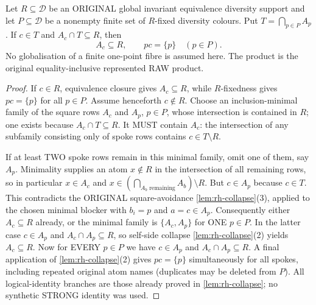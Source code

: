 \begin{lemma}
\label{lem:rh-spoke-square-localisation}
Let $R\subseteq\mathcal D$ be an ORIGINAL global
invariant equivalence diversity support and
let $P\subseteq\mathcal D$ be a nonempty
finite set of $R$-fixed diversity colours.
Put $T=\bigcap_{p\in P}A_p$.
If $c\in T$ and $A_c\cap T\subseteq R$, then
\[
              A_c\subseteq R,
              \qquad pc=\{p\}\quad(p\in P).
\]
No globalisation of a finite one-point fibre is
assumed here. The product is the original
equality-inclusive represented RAW product.
\end{lemma}
\begin{proof}
If $c\in R$, equivalence closure gives
$A_c\subseteq R$, while $R$-fixedness
gives $pc=\{p\}$ for all $p\in P$.
Assume henceforth $c\notin R$.
Choose an inclusion-minimal family of the
square rows $A_c$ and $A_p$, $p\in P$,
whose intersection is contained in $R$;
one exists because $A_c\cap T\subseteq R$.
It MUST contain $A_c$: the intersection
of any subfamily consisting only of
spoke rows contains $c\in T\setminus R$.

If at least TWO spoke rows remain in this
minimal family, omit one of them, say $A_p$.
Minimality supplies an atom
$x\notin R$ in the intersection of all
remaining rows, so in particular
$x\in A_c$ and
$x\in(\bigcap_{A_b\text{ remaining}}A_b)\setminus R$.
But $c\in A_p$ because $c\in T$.
This contradicts the ORIGINAL
square-avoidance
\cref{lem:rh-collapse}(3), applied to
the chosen minimal blocker with
$b_i=p$ and $a=c\in A_p$.
Consequently either $A_c\subseteq R$
already, or the minimal family is
$\{A_c,A_p\}$ for ONE $p\in P$.
In the latter case $c\in A_p$ and
$A_c\cap A_p\subseteq R$, so
self-side collapse
\cref{lem:rh-collapse}(2) yields
$A_c\subseteq R$.
Now for EVERY $p\in P$ we have
$c\in A_p$ and
$A_c\cap A_p\subseteq R$.
A final application of
\cref{lem:rh-collapse}(2) gives
$pc=\{p\}$ simultaneously for all
spokes, including repeated
original atom names (duplicates
may be deleted from $P$).
All logical-identity branches are
those already proved in
\cref{lem:rh-collapse}; no
synthetic STRONG identity was used.
\end{proof}

